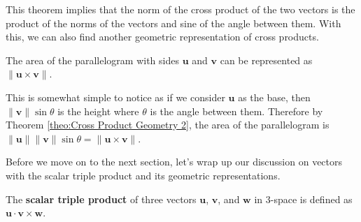 \documentclass[../../main.tex]{subfiles}
\begin{document}
This theorem implies that the norm of the cross product of the
two vectors is the product of the norms of the vectors and sine of
the angle between them. With this, we can also find another geometric
representation of cross products.

\begin{important}
The area of the parallelogram with sides $\mathbf{u}$ and $\mathbf{v}$
can be represented as $\| \mathbf{u} \times \mathbf{v} \|$.
\end{important}

This is somewhat simple to notice as if we consider $\mathbf{u}$
as the base, then $\| \mathbf{v} \| \sin\theta$ is the height
where $\theta$ is the angle between them. Therefore by Theorem
\ref{theo:Cross Product Geometry 2}, the area of the parallelogram
is $\| \mathbf{u} \| \| \mathbf{v} \| \sin\theta =
\| \mathbf{u} \times \mathbf{v} \|$.

Before we move on to the next section, let's wrap up our discussion
on vectors with the scalar triple product and its geometric
representations.

\begin{definition}{}{}
The \textbf{scalar triple product} of three vectors $\mathbf{u}$,
$\mathbf{v}$, and $\mathbf{w}$ in 3-space is defined as
$\mathbf{u} \cdot \mathbf{v} \times \mathbf{w}$.
\end{definition}
\end{document}
